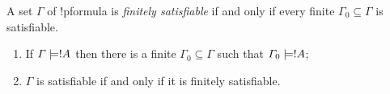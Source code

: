 \documentclass[../../include/open-logic-section]{subfiles}
\begin{document}

\begin{defn}
  A set $\Gamma$ of !p{formula} is \emph{finitely satisfiable} if and
  only if every finite $\Gamma_0 \subseteq \Gamma$ is satisfiable.
\end{defn}

\begin{thm}
\begin{enumerate}
  \item If $\Gamma \Entails !A$ then there is a finite $\Gamma_0
    \subseteq \Gamma$ such that $\Gamma_0 \Entails !A$;
  \item $\Gamma$ is satisfiable if and only if it is finitely
    satisfiable. 
\end{enumerate}
\end{thm}

\end{document}
